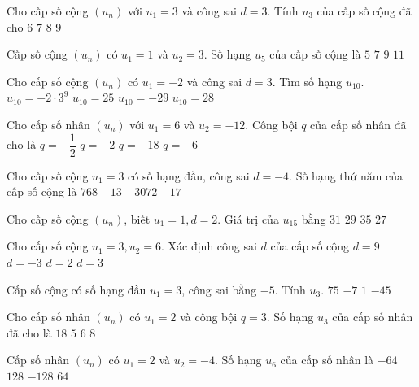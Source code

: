 \begin{ex}
Cho cấp số cộng $(u_n)$ với $u_1=3$ và công sai $d=3$. Tính $u_3$ của cấp số cộng đã cho
\choice
{$6$}
{$7$}
{$8$}
{\True $9$}
\end{ex}
\begin{ex}
Cấp số cộng $(u_n)$ có $u_1=1$ và $u_2=3$. Số hạng $u_5$ của cấp số cộng là
\choice
{$5$}
{$7$}
{\True $9$}
{$11$}
\end{ex}
\begin{ex}
Cho cấp số cộng $(u_n)$ có $u_1=-2$ và công sai $d=3$. Tìm số hạng $u_{10}$.
\choice
{$u_{10}=-2 \cdot 3^9$}
{\True $u_{10}=25$}
{$u_{10}=-29$}
{$u_{10}=28$}
\end{ex}
\begin{ex}
Cho cấp số nhân $(u_n)$ với $u_1=6$ và $u_2=-12$. Công bội $q$ của cấp số nhân đã cho là
\choice
{$q=-\dfrac{1}{2}$}
{\True $q=-2$}
{$q=-18$}
{$q=-6$}
\end{ex}
\begin{ex}
Cho cấp số cộng $u_1=3$ có số hạng đầu, công sai $d=-4$. Số hạng thứ năm của cấp số cộng là
\choice
{$768$}
{\True $-13$}
{$-3072$}
{$-17$}
\end{ex}
\begin{ex}
Cho cấp số cộng $(u_n)$, biết $u_1=1, d=2$. Giá trị của $u_{15}$ bằng
\choice
{$31$}
{\True $29$}
{$35$}
{$27$}
\end{ex}
\begin{ex}
Cho cấp số cộng $u_1=3,u_2=6$. Xác định công sai $d$ của cấp số cộng
\choice
{$d=9$}
{$d=-3$}
{\True $d=2$}
{$d=3$}
\end{ex}
\begin{ex}
Cấp số cộng có số hạng đầu $u_1=3$, công sai bằng $-5$. Tính $u_3$. 
\choice
{$75$}
{\True $-7$}
{$1$}
{$-45$}
\end{ex}
\begin{ex}
Cho cấp số nhân $(u_n)$ có $u_1=2$ và công bội $q=3$. Số hạng $u_3$ của cấp số nhân đã cho là
\choice
{\True $18$}
{$5$}
{$6$}
{$8$}
\end{ex}
\begin{ex}
Cấp số nhân $(u_n)$ có $u_1=2$ và $u_2=-4$. Số hạng $u_6$ của cấp số nhân là
\choice
{\True $-64$}
{$128$}
{$-128$}
{$64$}
\end{ex}
